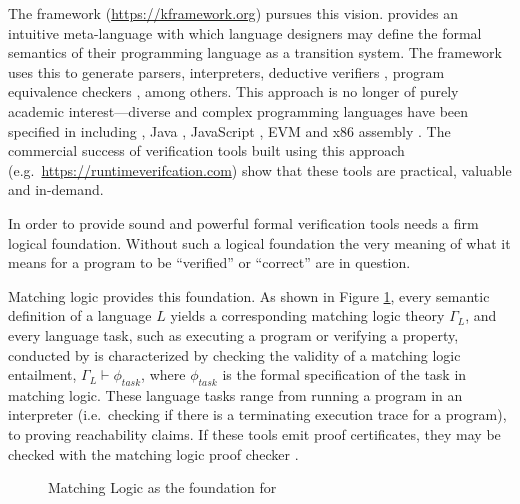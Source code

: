 The \K{} framework (\url{https://kframework.org}) pursues this vision.
\K{} provides an intuitive meta-language with which language designers
may define the formal semantics of their programming language
as a transition system.
The framework uses this to generate
parsers, interpreters, deductive verifiers \cite{SPY+16,Ros17a},
program equivalence checkers \cite{kasampalis2021language}, among others.
This approach is no longer of purely academic interest---diverse and complex programming languages have been specified in \K{}
including \cite{c-semantics}, Java \cite{java-semantics}, JavaScript \cite{javascript-semantics},
EVM \cite{evm-semantics} and x86 assembly \cite{x86-semantics}.
The commercial success of verification tools built using this approach (e.g.~\url{https://runtimeverifcation.com}) show that these tools are practical, valuable
and in-demand.

In order to provide sound and powerful formal verification tools \K{} needs a firm logical foundation.
Without such a logical foundation the very meaning of what it means for a program to be ``verified'' or ``correct'' are in question.

Matching logic \cite{matchinglogiclmcs,matching-mu-logic,matching-logic-explained} provides this foundation.
As shown in Figure \ref{fig:ml-as-basis-for-k}, every \K{} semantic definition of a language \(L\) yields a corresponding matching logic theory \(\Gamma_L\),
and every language task, such as executing a program or verifying a property, conducted by \K{}
is characterized by checking the validity of a matching logic entailment,
\(\Gamma_L \vdash \phi_\mathit{task}\), where \(\phi_\mathit{task}\) is the formal specification of the task in matching logic.
These language tasks range from running a program in an interpreter
(i.e.~checking if there is a terminating execution trace for a program),
to proving reachability claims.
If these tools emit proof certificates, they may be checked with the matching logic proof checker \cite{chen-lin-trinh-rosu-2021-cav}.

\begin{figure}
\def\svgwidth{\columnwidth}
\newcommand{\kbox}[1]{
    \tikz[baseline=(char.base)]{\node[draw,rectangle,rounded corners=2pt,inner sep=2pt] (char){\phantom{\rlap{yL$._y$}}#1};}
}
\newcommand{\g}[1]{$\Gamma_\text{#1}$}

\caption{Matching Logic as the foundation for \K{}}
\label{fig:ml-as-basis-for-k}
\end{figure}

